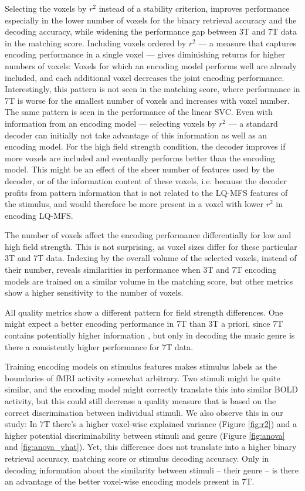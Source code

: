 Selecting the voxels by $r^2$ instead of a stability criterion, improves
performance especially in the lower number of voxels for the binary retrieval
accuracy and the decoding accuracy, while widening the performance gap between
3T and 7T data in the matching score. Including voxels ordered by $r^2$
--- a measure that captures encoding performance in a single voxel --- gives
diminishing returns for higher numbers of voxels: Voxels for which an encoding
model performs well are already included, and each additional voxel decreases
the joint encoding performance.  Interestingly, this pattern is not seen in the
matching score, where performance in 7T is worse for the smallest number
of voxels and increases with voxel number. The same pattern is seen in the
performance of the linear SVC. Even with information from an encoding model ---
selecting voxels by $r^2$ --- a standard decoder can initially not take
advantage of this information as well as an encoding model. For the high field
strength condition, the decoder improves if more voxels are included and
eventually performs better than the encoding model. This might be an effect of
the sheer number of features used by the decoder, or of the information content
of these voxels, i.e. because the decoder profits from pattern information that
is not related to the LQ-MFS features of the stimulus, and would therefore be
more present in a voxel with lower $r^2$ in encoding LQ-MFS.

The number of voxels affect the encoding performance differentially for low and
high field strength. This is not surprising, as voxel sizes differ for these
particular 3T and 7T data. Indexing by the overall volume of the selected
voxels, instead of their number, reveals similarities in performance when 3T
and 7T encoding models are trained on a similar volume in the matching
score, but other metrics show a higher sensitivity to the number of
voxels.

All quality metrics show a different pattern for field strength differences.
One might expect a better encoding performance in 7T than 3T a priori, since 7T contains
potentially higher information \citep{FK12}, but only in decoding the music genre
is there a consistently higher performance for 7T data.

Training encoding models on stimulus features makes stimulus labels as the
boundaries of f{MRI} activity somewhat arbitrary. Two stimuli might be quite
similar, and the encoding model might correctly translate this into similar BOLD
activity, but this could still decrease a quality measure that is based on the
correct discrimination between individual stimuli. We also observe this in our
study: In 7T there's a higher voxel-wise explained variance (Figure \ref{fig:r2}) and a higher potential discriminability
between stimuli and genre (Figure \ref{fig:anova} and \ref{fig:anova_yhat}). Yet, this difference does not translate into a higher
binary retrieval accuracy, matching score or stimulus decoding accuracy. Only
in decoding information about the similarity between stimuli -- their genre
-- is there an advantage of the better voxel-wise encoding models present in
7T.

